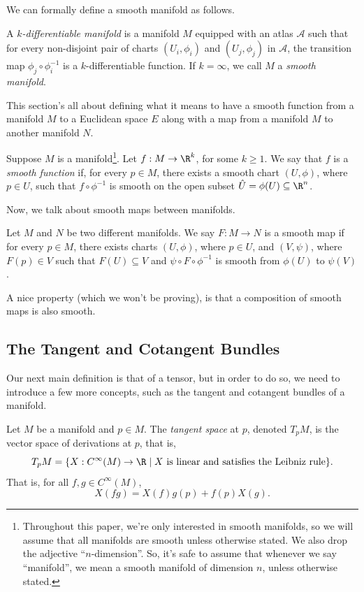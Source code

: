 We can formally define a smooth manifold as follows.
\begin{definition}
  A \emph{$k$-differentiable manifold} is a manifold $M$ equipped with an atlas $\mathcal{A}$ such that for every non-disjoint pair of charts $(U_i, \phi_i)$ and $(U_j, \phi_j)$ in $\mathcal{A}$, the transition map $\phi_j \circ \phi_i^{-1}$ is a $k$-differentiable function. If $k = \infty$, we call $M$ a \emph{smooth manifold}.
\end{definition}

\label{sub_sec:smooth_functions_and_maps}
This section's all about defining what it means to have a smooth function from a manifold $M$ to a Euclidean space $E$ along with a map from a manifold $M$ to another manifold $N$.
\begin{definition}
  Suppose $M$ is a manifold\footnote{Throughout this paper, we're only interested in smooth manifolds, so we will assume that all manifolds are smooth unless otherwise stated. We also drop the adjective ``$n$-dimension''. So, it's safe to assume that whenever we say ``manifold'', we mean a smooth manifold of dimension $n$, unless otherwise stated.}. Let $f : M \to \R^k$, for some $k \ge 1$. We say that $f$ is a \emph{smooth function} if, for every $p \in M$, there exists a smooth chart $(U, \phi)$, where $p \in U$, such that $f \circ \phi^{-1}$ is smooth on the open subset $\hat{U} = \phi(U) \subseteq \R^n$.
\end{definition}
Now, we talk about smooth maps between manifolds.
\begin{definition}
  Let $M$ and $N$ be two different manifolds. We say $F : M \to N$ is a smooth map if for every $p \in M$, there exists charts $(U, \phi)$, where $p \in U$, and $(V, \psi)$, where $F(p) \in V$ such that $F(U) \subseteq V$ and $\psi \circ F \circ \phi^{-1}$ is smooth from $\phi(U)$ to $\psi(V)$.
\end{definition}

A nice property (which we won't be proving), is that a composition of smooth maps is also smooth.


\subsection{The Tangent and Cotangent Bundles} Our next main definition is that of a tensor, but in order to do so, we need to introduce a few more concepts, such as the tangent and cotangent bundles of a manifold.
\begin{definition}
  Let $M$ be a manifold and $p \in M$. The \emph{tangent space} at $p$, denoted $T_pM$, is the vector space of derivations at $p$, that is,
  \[%
    T_pM = \{X : C^\infty(M) \to \R \mid X~\text{is linear and satisfies the Leibniz rule}\}
  .\]%
  That is, for all $f,g \in C^\infty(M)$,
  \[%
    X(fg) = X(f)g(p) + f(p)X(g)
  .\]%
\end{definition}

